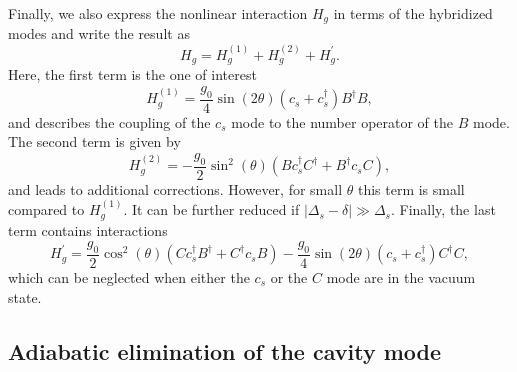 Finally, we also express the nonlinear interaction $H_g$ in terms of the
hybridized modes and write the result as
\begin{equation}\label{eq:SM_HgDecomp}
H_g= H_g^{(1)} + H_g^{(2)} + H_g^\prime. 
\end{equation}
Here, the first term is the one of interest 
\begin{equation}
H_g^{(1)} = \frac{g_0}{4}  \sin(2\theta)  \left( c_s + c_s^\dag\right) B^\dag B
,
\end{equation}
and describes the coupling of the $c_s$ mode to the number operator of the $B$
mode.
The second term is given by
\begin{equation}
H_g^{(2)} = -\frac{g_0}{2}  \sin^2(\theta)  \left( B  c_s^\dag C^\dag  + B^\dag 
c_s C \right),
\end{equation}
and leads to additional corrections. However, for small $\theta$ this term is
small compared to $H_g^{(1)}$. It can be further reduced if 
$|\Delta_s-\delta|\gg \Delta_s$.
Finally, the last term contains interactions
\begin{equation}
H_g^{\prime} = \frac{g_0}{2}  \cos^2(\theta)  \left( C c_s^\dag B^\dag  +
C^\dag  c_s B \right)  - \frac{g_0}{4}  \sin(2\theta)  \left( c_s +
c_s^\dag\right) C^\dag C,
\end{equation}
which can be neglected when either the $c_s$ or the $C$ mode are in the vacuum
state.


\subsection{Adiabatic elimination of the cavity mode}

